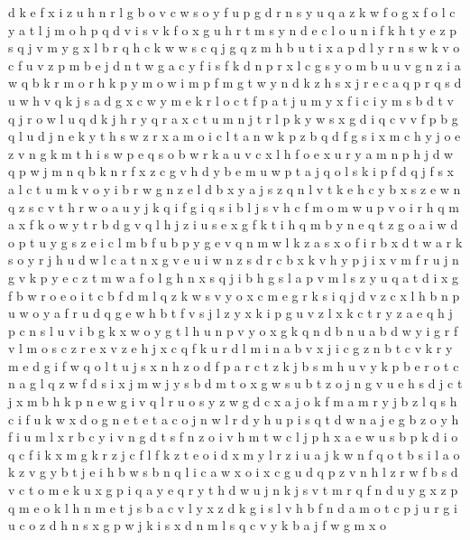 \documentclass{article}
\begin{document}
d k e f x i z u h n r l g b o v c w s
o y f u p g d r
n s y u q a z k w f o g x
f o l c y a
t l j m o h p q d v i s
v k f o x g u h r t m s y n d e
c l o u n i f k h t y e z p s q j v m
y g x l b r q h c k w
w s c q
j g q z m h b u t i x a p d l y r n s w k v o c f
u v z p m b e j d n t w g a c y f i s
f k d n p r x l c g s y o m b u
u v g n z i a w q b k r m o
r h k p y m o w i
m
p f m g t w y n d k z h s x j r e c a q
p r q s d u w
h v q k j s a d g x c w y m e
k r l o c t f p
a t j u m y x f i
c i y m s b d t v q j r o w l u
q d k j
h r y q
r a x c t
u m n j t r l p k y w s x g d i q c v
v f p b g q l u d j n e k y t h s w z r x a m o i c
l t a n w k p z b q d f g s i x m c h y j o e
z v n g k m t h i s w p e q
s o b w r k a u v c x l h f
o e x u r y a m n p h j d w q
p w j m n q b k
n r f x z c g v h d y b e m u w p t a j q o l s k i
p f
d q j f s x a l c t u m k v o y i b r w g n z e
l d
b
x y a
j s z q n l v
t k e h c y b x s z
e w n q
z s c v t h r w o a u y j k q i f g
i q s
i b l j s v h c f m o
m w u p v o i
r h q
m a x f k o w y t r b d g v q l h j z i u s e
x g f k t i h q m b
y n e q t z g o a i
w d o p t u y g s z e i c l m b f
u b p y g e v q n m w l k z a s x o f i r
b x d t w a r
k s o y r j h u d w l c a t n x g v e
u i w n z s d r c b x k v h y p j
i x v m f r u j n g
v k p y e c z t m w a f o l g h n x s q j i b
h g s l a p v
m l s z y u q a t d i x g f b w r o e
o i t c b f
d m l q z k w s v y o x c
m e g r k s i q j d v z c x l h b n p u w o y a f
r u d q g e w h b t f v s j l z y x k i
p g u v z l x
k c
t r y z a e q h j p c n s l u v i b g k x w o
y g t l h u
n p
v
y o x g k q n d b
n u a b d w y i g r f v l m o
s c z r e x v
z e h j x c q f k u r d l m i n a b v
x j i c g z n b t
c v k r y m e d g i f w q o l t u j s x n h z
o d f p a r c t z k j b s m
h u v y k p b e r o t c n a g l q z w f d s i x j m
w j y s b d m t o x g
w s u b t z o j n
g v u e h s d j
c t j x m b h k p n e w g i v q l r u o s y z
w g d c x a j o k f m
a m r y j b z l q s h c i f u k w x d o g n e t
e t a c o j n w l r d y h u p i
s q t d w n a j e g b z o y h f i u m l x r
b c y i v n g d t s
f n z o i v h m t w c l j p
h x a e w u s b p k d i o q c f
i k x
m g k r z j c f l
f k z t e o i d
x m y l r z i u a j k w n f q o t b
s i l a o k z v g y b
t j
e i h b w
s b n q l i c a w x
o i x c g u d q p z v n h
l z r w f b s d v c t o m e k u x g p i q a y
e q r y t h d
w u j n
k j s v t m r q f n d u y g x z p
q m e o k l
h n m e t j s b a c v l y x z d k g i
s l v h b f n d a m o t c p j u r g
i u c o z d h n s x g p w
j k i s x d n m l
s q c v y k b a j f w g m x o
\end{document}
